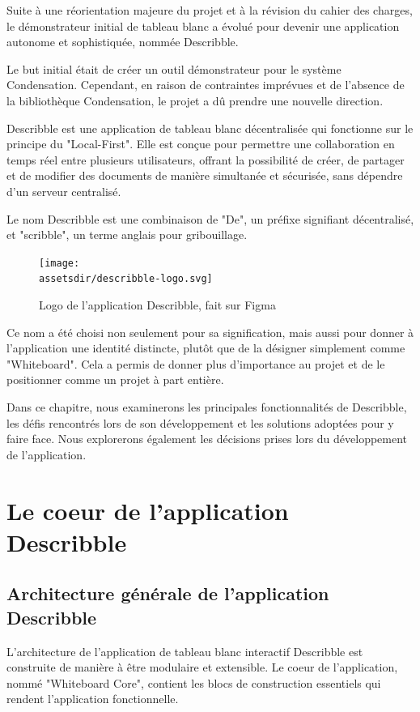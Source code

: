 Suite à une réorientation majeure du projet et à la révision du cahier des charges, le démonstrateur initial de tableau blanc a évolué pour devenir une application autonome et sophistiquée, nommée Describble.

Le but initial était de créer un outil démonstrateur pour le système Condensation. Cependant, en raison de contraintes imprévues et de l'absence de la bibliothèque Condensation, le projet a dû prendre une nouvelle direction.

Describble est une application de tableau blanc décentralisée qui fonctionne sur le principe du "Local-First". Elle est conçue pour permettre une collaboration en temps réel entre plusieurs utilisateurs, offrant la possibilité de créer, de partager et de modifier des documents de manière simultanée et sécurisée, sans dépendre d'un serveur centralisé.

Le nom Describble est une combinaison de "De", un préfixe signifiant décentralisé, et "scribble", un terme anglais pour gribouillage.

\begin{figure}[h]
    \centering
    \texttt{[image: \\assetsdir/describble-logo.svg]}
    \caption{Logo de l'application Describble, fait sur Figma}
\end{figure}

Ce nom a été choisi non seulement pour sa signification, mais aussi pour donner à l'application une identité distincte, plutôt que de la désigner simplement comme "Whiteboard". Cela a permis de donner plus d'importance au projet et de le positionner comme un projet à part entière.

Dans ce chapitre, nous examinerons les principales fonctionnalités de Describble, les défis rencontrés lors de son développement et les solutions adoptées pour y faire face. Nous explorerons également les décisions prises lors du développement de l'application.


\section{Le coeur de l'application Describble}

\subsection{Architecture générale de l'application Describble}

L'architecture de l'application de tableau blanc interactif Describble est construite de manière à être modulaire et extensible. Le coeur de l'application, nommé "Whiteboard Core", contient les blocs de construction essentiels qui rendent l'application fonctionnelle.

